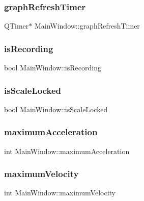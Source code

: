 \subsubsection{\texorpdfstring{graph\+Refresh\+Timer}{graphRefreshTimer}}
{\footnotesize\ttfamily Q\+Timer$\ast$ Main\+Window\+::graph\+Refresh\+Timer}

\hypertarget{class_main_window_a23fa0be440d34e4569d9e2d323410e7d}{}\label{class_main_window_a23fa0be440d34e4569d9e2d323410e7d} 
\subsubsection{\texorpdfstring{is\+Recording}{isRecording}}
{\footnotesize\ttfamily bool Main\+Window\+::is\+Recording}

\hypertarget{class_main_window_a1f43f19e84b444053fd775d25d2aa07d}{}\label{class_main_window_a1f43f19e84b444053fd775d25d2aa07d} 
\subsubsection{\texorpdfstring{is\+Scale\+Locked}{isScaleLocked}}
{\footnotesize\ttfamily bool Main\+Window\+::is\+Scale\+Locked}

\hypertarget{class_main_window_a6b3e09f92d0e995e5c349d6658121364}{}\label{class_main_window_a6b3e09f92d0e995e5c349d6658121364} 
\subsubsection{\texorpdfstring{maximum\+Acceleration}{maximumAcceleration}}
{\footnotesize\ttfamily int Main\+Window\+::maximum\+Acceleration}

\hypertarget{class_main_window_a14e66dcaf2393eed660d558651b07e94}{}\label{class_main_window_a14e66dcaf2393eed660d558651b07e94} 
\subsubsection{\texorpdfstring{maximum\+Velocity}{maximumVelocity}}
{\footnotesize\ttfamily int Main\+Window\+::maximum\+Velocity}

